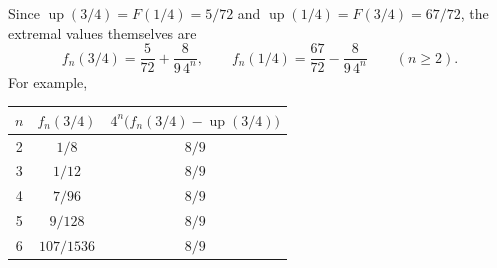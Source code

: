 \documentclass[11pt,oneside]{article}
\theoremstyle{definition}
\theoremstyle{remark}
\newcommand{\Up}{\operatorname{up}}
\begin{document}
Since $\Up(3/4)=F(1/4)=5/72$ and $\Up(1/4)=F(3/4)=67/72$, the extremal values themselves are
\begin{equation}
 f_n(3/4)=\frac5{72}+\frac8{9\,4^n},
 \qquad
 f_n(1/4)=\frac{67}{72}-\frac8{9\,4^n}
 \qquad(n\ge2).                                            \label{eq:extremal-values}
\end{equation}
For example,
\begin{center}
\begin{tabular}{c@{\qquad}c@{\qquad}c}
\toprule
$n$ & $f_n(3/4)$ & $4^n\bigl(f_n(3/4)-\Up(3/4)\bigr)$\\
\midrule
2 & $1/8$ & $8/9$\\
3 & $1/12$ & $8/9$\\
4 & $7/96$ & $8/9$\\
5 & $9/128$ & $8/9$\\
6 & $107/1536$ & $8/9$\\
\bottomrule
\end{tabular}
\end{center}
\end{document}

